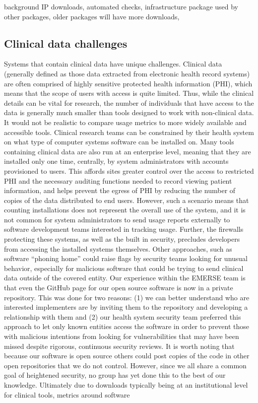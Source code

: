 \documentclass{article}
\begin{document}
background IP downloads, automated checks, infrastructure package used by other packages, older packages will have more downloads, 







\subsection{Clinical data challenges}

Systems that contain clinical data have unique challenges.  Clinical data (generally defined as those data extracted from electronic health record systems) are often comprised of highly sensitive protected health information (PHI), which means that the scope of users with access is quite limited. Thus, while the clinical details can be vital for research, the number of individuals that have access to the data is generally much smaller than tools designed to work with non-clinical data. It would not be realistic to compare usage metrics to more widely available and accessible tools. Clinical research teams can be constrained by their health system on what type of computer systems software can be installed on. Many tools containing clinical data are also run at an enterprise level, meaning that they are installed only one time, centrally, by system administrators with accounts provisioned to users. This affords sites greater control over the access to restricted PHI and the necessary auditing functions needed to record viewing patient information, and helps prevent the egress of PHI by reducing the number of copies of the data distributed to end users.  However, such a scenario means that counting installations does not represent the overall use of the system, and it is not common for system administrators to send usage reports externally to software development teams interested in tracking usage.  Further, the firewalls protecting these systems, as well as the built in security, precludes developers from accessing the installed systems themselves. Other approaches, such as software “phoning home” could raise flags by security teams looking for unusual behavior, especially for malicious software that could be trying to send clinical data outside of the covered entity. Our experience within the EMERSE team is that even the GitHub page for our open source software is now in a private repository. This was done for two reasons: (1) we can better understand who are interested implementers are by inviting them to the repository and developing a relationship with them and (2) our health system security team preferred this approach to let only known entities access the software in order to prevent those with malicious intentions from looking for vulnerabilities that may have been missed despite rigorous, continuous security reviews.  It is worth noting that because our software is open source others could post copies of the code in other open repositories that we do not control.  However, since we all share a common goal of heightened security, no group has yet done this to the best of our knowledge. Ultimately due to downloads typically being at an institutional level for clinical tools, metrics around software 
\end{document}
